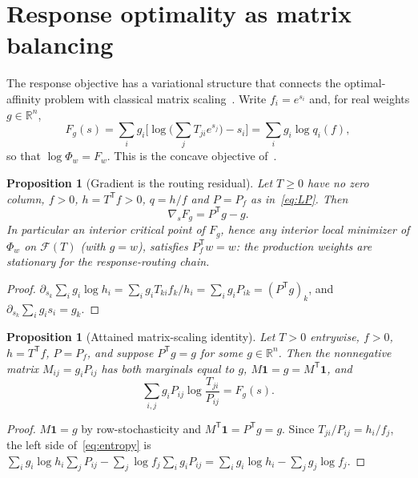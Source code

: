 \documentclass[11pt,reqno]{amsart}
\theoremstyle{plain}
\newtheorem{proposition}[theorem]{Proposition}
\theoremstyle{definition}
\theoremstyle{remark}
\numberwithin{equation}{section}
\newcommand{\R}{\mathbb{R}}
\newcommand{\one}{\mathbf{1}}
\newcommand{\T}{\mathsf{T}}
\newcommand{\cone}{\mathcal{F}}
\begin{document}
\section{Response optimality as matrix balancing}\label{sec:scaling}

The response objective has a variational structure that connects the optimal-affinity problem with classical matrix scaling~\cite{Sin64,SK67,Idel16}.  Write $f_i=e^{s_i}$ and, for real weights $g\in\R^n$,
\begin{equation}\label{eq:logobjective}
F_g(s)=\sum_ig_i\Big[\log\Big(\sum_jT_{ji}e^{s_j}\Big)-s_i\Big]=\sum_ig_i\log q_i(f),
\end{equation}
so that $\log\Phi_w=F_w$.  This is the concave objective of~\cite[Supplementary Note~11]{DDL24}.

\begin{proposition}[Gradient is the routing residual]\label{prop:kkt}
Let $T\ge0$ have no zero column, $f>0$, $h=T^{\T}f>0$, $q=h/f$ and $P=P_f$ as in~\eqref{eq:LP}.  Then
\[
\nabla_sF_g=P^{\T}g-g .
\]
In particular an interior critical point of $F_g$, hence any interior local minimizer of $\Phi_w$ on $\cone(T)$ (with $g=w$), satisfies $P_f^{\T}w=w$: the production weights are stationary for the response-routing chain.
\end{proposition}

\begin{proof}
$\partial_{s_k}\sum_ig_i\log h_i=\sum_ig_iT_{ki}f_k/h_i=\sum_ig_iP_{ik}=(P^{\T}g)_k$, and $\partial_{s_k}\sum_ig_is_i=g_k$.
\end{proof}

\begin{proposition}[Attained matrix-scaling identity]\label{prop:dual}
Let $T>0$ entrywise, $f>0$, $h=T^{\T}f$, $P=P_f$, and suppose $P^{\T}g=g$ for some $g\in\R^n$.  Then the nonnegative matrix $M_{ij}=g_iP_{ij}$ has both marginals equal to $g$, $M\one=g=M^{\T}\one$, and
\begin{equation}\label{eq:entropy}
\sum_{i,j}g_iP_{ij}\log\frac{T_{ji}}{P_{ij}}=F_g(s).
\end{equation}
\end{proposition}

\begin{proof}
$M\one=g$ by row-stochasticity and $M^{\T}\one=P^{\T}g=g$.  Since $T_{ji}/P_{ij}=h_i/f_j$, the left side of~\eqref{eq:entropy} is $\sum_ig_i\log h_i\sum_jP_{ij}-\sum_j\log f_j\sum_ig_iP_{ij}=\sum_ig_i\log h_i-\sum_jg_j\log f_j$.
\end{proof}
\end{document}
